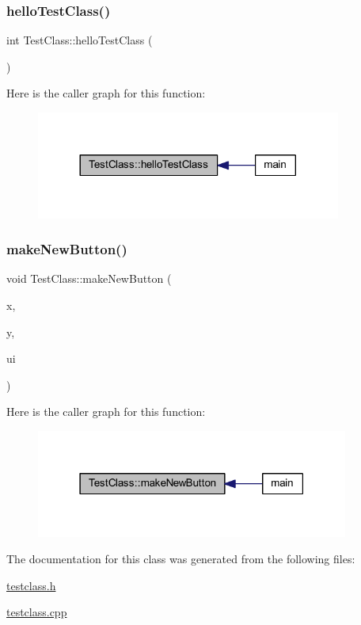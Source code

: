 \subsubsection{\texorpdfstring{hello\+Test\+Class()}{helloTestClass()}}
{\footnotesize\ttfamily int Test\+Class\+::hello\+Test\+Class (\begin{DoxyParamCaption}{ }\end{DoxyParamCaption})}

Here is the caller graph for this function\+:\nopagebreak
\begin{figure}[H]
\begin{center}
\leavevmode
\includegraphics[width=284pt]{class_test_class_a842a304e200248cadf04d06126b51124_icgraph}
\end{center}
\end{figure}
\mbox{\label{class_test_class_aea6363a0f95a01e45d2850ece2e00b9e}} 
\subsubsection{\texorpdfstring{make\+New\+Button()}{makeNewButton()}}
{\footnotesize\ttfamily void Test\+Class\+::make\+New\+Button (\begin{DoxyParamCaption}\item[{int}]{x,  }\item[{int}]{y,  }\item[{\mbox{\hyperlink{class_main_window}{Main\+Window}} $\ast$}]{ui }\end{DoxyParamCaption})}

Here is the caller graph for this function\+:
\nopagebreak
\begin{figure}[H]
\begin{center}
\leavevmode
\includegraphics[width=291pt]{class_test_class_aea6363a0f95a01e45d2850ece2e00b9e_icgraph}
\end{center}
\end{figure}


The documentation for this class was generated from the following files\+:\begin{DoxyCompactItemize}
\item 
\mbox{\hyperlink{testclass_8h}{testclass.\+h}}\item 
\mbox{\hyperlink{testclass_8cpp}{testclass.\+cpp}}\end{DoxyCompactItemize}

